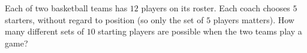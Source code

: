 Each of two basketball teams has $12$ players on its roster. Each coach chooses $5$ starters, without regard to position (so only the set of $5$ players matters). How many different sets of $10$ starting players are possible when the two teams play a game?
